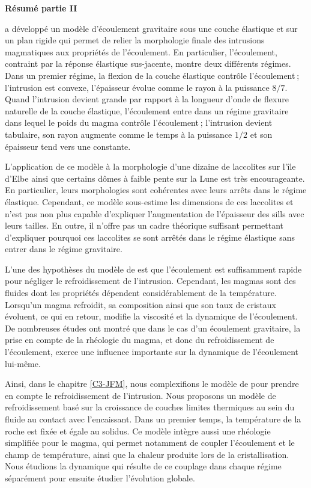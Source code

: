 \thispagestyle{plain}
\begin{flushleft}
 \Large \vspace{.5cm} \textbf{Résumé partie II}
\end{flushleft}

\citet{Michaut:2011kg} a développé un modèle d’écoulement gravitaire
sous une couche élastique et sur un plan rigide qui permet de relier
la morphologie finale des intrusions magmatiques aux propriétés de
l’écoulement. En particulier, l’écoulement, contraint par la réponse
élastique sus-jacente, montre deux différents régimes. Dans un premier
régime, la flexion de la couche élastique contrôle l’écoulement ;
l’intrusion est convexe, l’épaisseur évolue comme le rayon à la
puissance $8/7$. Quand l’intrusion devient grande par rapport à la
longueur d’onde de flexure naturelle de la couche élastique,
l’écoulement entre dans un régime gravitaire dans lequel le poids du
magma contrôle l’écoulement ; l’intrusion devient tabulaire, son rayon
augmente comme le temps à la puissance $1/2$ et son épaisseur tend
vers une constante.

L’application de ce modèle à la morphologie d’une dizaine de
laccolites sur l’île d’Elbe ainsi que certains dômes à faible pente
sur la Lune est très encourageante. En particulier, leurs morphologies
sont cohérentes avec leurs arrêts dans le régime élastique. Cependant,
ce modèle sous-estime les dimensions de ces laccolites et n’est pas
non plus capable d’expliquer l’augmentation de l’épaisseur des sills
avec leurs tailles. En outre, il n’offre pas un cadre théorique
suffisant permettant d’expliquer pourquoi ces laccolites se sont
arrêtés dans le régime élastique sans entrer dans le régime
gravitaire.

L’une des hypothèses du modèle de \citet{Michaut:2011kg} est que
l’écoulement est suffisamment rapide pour négliger le refroidissement
de l’intrusion. Cependant, les magmas sont des fluides dont les
propriétés dépendent considérablement de la température. Lorsqu’un
magma refroidit, sa composition ainsi que son taux de cristaux
évoluent, ce qui en retour, modifie la viscosité et la dynamique de
l’écoulement. De nombreuses études ont montré que dans le cas d’un
écoulement gravitaire, la prise en compte de la rhéologie du magma, et
donc du refroidissement de l’écoulement, exerce une influence
importante sur la dynamique de l’écoulement lui-même.

Ainsi, dans le chapitre \ref{C3-JFM}, nous complexifions le modèle de
\citet{Michaut:2011kg} pour prendre en compte le refroidissement de
l’intrusion. Nous proposons un modèle de refroidissement basé sur la
croissance de couches limites thermiques au sein du fluide au contact
avec l'encaissant. Dans un premier temps, la température de la roche
est fixée et égale au solidus. Ce modèle intègre aussi
une rhéologie simplifiée pour le magma, qui permet notamment de
coupler l’écoulement et le champ de température, ainsi que la chaleur
produite lors de la cristallisation. Nous étudions la dynamique qui
résulte de ce couplage dans chaque régime séparément pour ensuite
étudier l’évolution globale.

